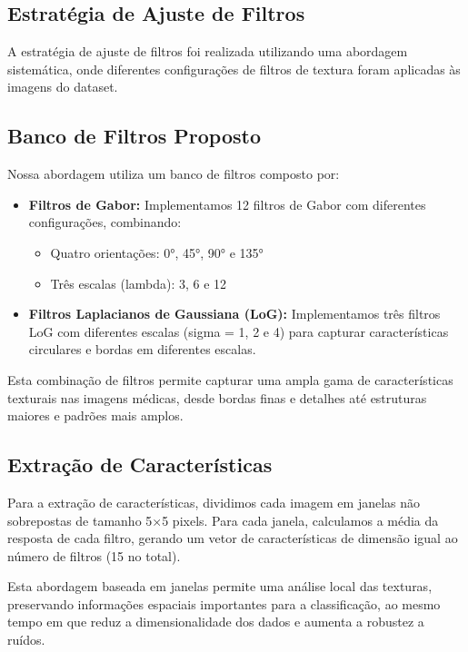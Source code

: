 \documentclass[sigconf,nonacm]{acmart}
\begin{document}
\subsection{Estratégia de Ajuste de Filtros}

A estratégia de ajuste de filtros foi realizada utilizando uma abordagem sistemática, onde diferentes configurações de filtros de textura foram aplicadas às imagens do dataset. 

\subsection{Banco de Filtros Proposto}

Nossa abordagem utiliza um banco de filtros composto por:

\begin{itemize}
  \item \textbf{Filtros de Gabor:} Implementamos 12 filtros de Gabor com diferentes configurações, combinando:
  \begin{itemize}
    \item Quatro orientações: 0°, 45°, 90° e 135°
    \item Três escalas (lambda): 3, 6 e 12
  \end{itemize}
  \item \textbf{Filtros Laplacianos de Gaussiana (LoG):} Implementamos três filtros LoG com diferentes escalas (sigma = 1, 2 e 4) para capturar características circulares e bordas em diferentes escalas.
\end{itemize}

Esta combinação de filtros permite capturar uma ampla gama de características texturais nas imagens médicas, desde bordas finas e detalhes até estruturas maiores e padrões mais amplos.

\subsection{Extração de Características}

Para a extração de características, dividimos cada imagem em janelas não sobrepostas de tamanho 5×5 pixels. Para cada janela, calculamos a média da resposta de cada filtro, gerando um vetor de características de dimensão igual ao número de filtros (15 no total).

Esta abordagem baseada em janelas permite uma análise local das texturas, preservando informações espaciais importantes para a classificação, ao mesmo tempo em que reduz a dimensionalidade dos dados e aumenta a robustez a ruídos.
\end{document}
